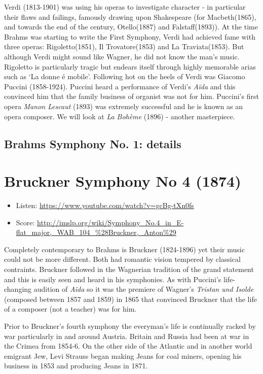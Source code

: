 Verdi (1813-1901) was using his operas to investigate character - in particular their flaws and failings, famously drawing upon Shakespeare (for Macbeth(1865), and towards the end of the century, Otello(1887) and Falstaff(1893)). 
At the time Brahms was starting to write the First Symphony, Verdi had achieved fame with three operas: Rigoletto(1851), Il Trovatore(1853) and La Traviata(1853). But although Verdi might sound like Wagner, he did not know the man's music. Rigoletto is particularly tragic but endears itself through highly memorable arias such as `La donne \'e mobile'. Following hot on the heels of Verdi was Giacomo Puccini (1858-1924). Puccini heard a performance of Verdi's \textit{A\"ida} and this convinced him that the family business of organist was not for him. Puccini's first opera \textit{Manon Lescaut} (1893) was extremely successful and he is known as an opera composer. We will look at \textit{La Boh\`eme} (1896) - another masterpiece. 

\subsection{Brahms Symphony No. 1: details} 


\section{Bruckner Symphony No 4 (1874)}
\begin{itemize}
\item Listen: \url{https://www.youtube.com/watch?v=gcBg-tXn0fs}
\item Score: \url{http://imslp.org/wiki/Symphony_No.4_in_E-flat_major,_WAB_104_%28Bruckner,_Anton%29}
\end{itemize}

Completely contemporary to Brahms is Bruckner (1824-1896) yet their music could not be more different. Both had romantic vision tempered by classical contraints. Bruckner followed in the Wagnerian tradition of the grand statement and this is easily seen and heard in his symphonies. As with Puccini's life-changing audition of \textit{A\"ida} so it was the premiere of Wagner's \textit{Tristan und Isolde} (composed between 1857 and 1859) in 1865 that convinced Bruckner that the life of a composer (not a teacher) was for him. 

Prior to Bruckner's fourth symphony the everyman's life is continually racked by war particularly in and around Austria. Britain and Russia had been at war in the Crimea from 1854-6. On the other side of the Atlantic and in another world emigrant Jew, Levi Strauss began making Jeans for coal miners, opening his business in 1853 and producing Jeans in 1871.  


